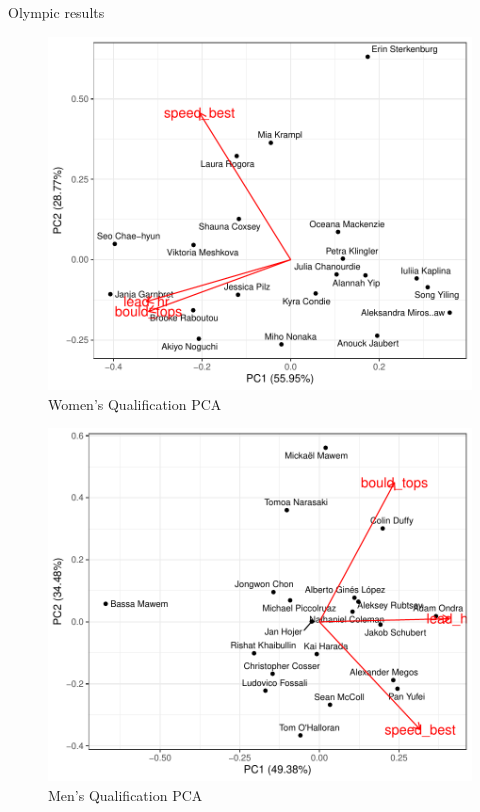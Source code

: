 \documentclass[12pt]{article}
\begin{document}
Olympic results

\begin{figure}

{\centering \includegraphics{draft_files/figure-latex/unnamed-chunk-23-1} 

}

\caption{Women's Qualification PCA}\label{fig:unnamed-chunk-23}
\end{figure}

\begin{figure}

{\centering \includegraphics{draft_files/figure-latex/unnamed-chunk-24-1} 

}

\caption{Men's Qualification PCA}\label{fig:unnamed-chunk-24}
\end{figure}
\end{document}
